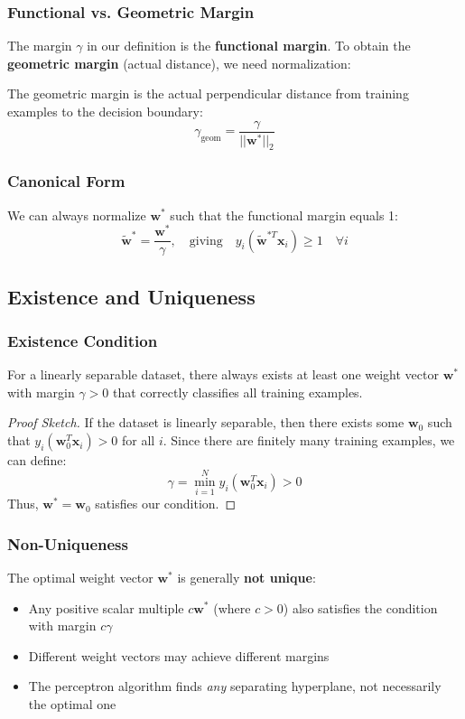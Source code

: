 \subsubsection{Functional vs. Geometric Margin}
The margin \(\gamma\) in our definition is the \textbf{functional margin}. To obtain the \textbf{geometric margin} (actual distance), we need normalization:

\begin{definition}
The geometric margin is the actual perpendicular distance from training examples to the decision boundary:
\[\gamma_{\text{geom}} = \frac{\gamma}{||\mathbf{w}^*||_2}\]
\end{definition}

\subsubsection{Canonical Form}
We can always normalize \(\mathbf{w}^*\) such that the functional margin equals 1:
\[\tilde{\mathbf{w}}^* = \frac{\mathbf{w}^*}{\gamma}, \quad \text{giving} \quad y_i(\tilde{\mathbf{w}}^{*T} \mathbf{x}_i) \geq 1 \quad \forall i\]

\subsection{Existence and Uniqueness}

\subsubsection{Existence Condition}
\begin{theorem}
For a linearly separable dataset, there always exists at least one weight vector \(\mathbf{w}^*\) with margin \(\gamma > 0\) that correctly classifies all training examples.
\end{theorem}

\begin{proof}[Proof Sketch]
If the dataset is linearly separable, then there exists some \(\mathbf{w}_0\) such that \(y_i(\mathbf{w}_0^T \mathbf{x}_i) > 0\) for all \(i\). Since there are finitely many training examples, we can define:
\[\gamma = \min_{i=1}^N y_i(\mathbf{w}_0^T \mathbf{x}_i) > 0\]
Thus, \(\mathbf{w}^* = \mathbf{w}_0\) satisfies our condition.
\end{proof}

\subsubsection{Non-Uniqueness}
The optimal weight vector \(\mathbf{w}^*\) is generally \textbf{not unique}:
\begin{itemize}
    \item Any positive scalar multiple \(c\mathbf{w}^*\) (where \(c > 0\)) also satisfies the condition with margin \(c\gamma\)
    \item Different weight vectors may achieve different margins
    \item The perceptron algorithm finds \textit{any} separating hyperplane, not necessarily the optimal one
\end{itemize}

